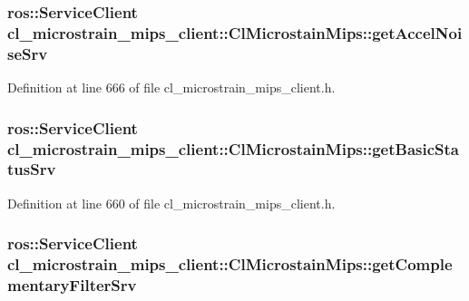 \subsubsection[{\texorpdfstring{get\+Accel\+Noise\+Srv}{getAccelNoiseSrv}}]{\setlength{\rightskip}{0pt plus 5cm}ros\+::\+Service\+Client cl\+\_\+microstrain\+\_\+mips\+\_\+client\+::\+Cl\+Microstain\+Mips\+::get\+Accel\+Noise\+Srv\hspace{0.3cm}{\ttfamily [protected]}}\hypertarget{classcl__microstrain__mips__client_1_1ClMicrostainMips_a0e216421596a37cc683a07c386e16190}{}\label{classcl__microstrain__mips__client_1_1ClMicrostainMips_a0e216421596a37cc683a07c386e16190}


Definition at line 666 of file cl\+\_\+microstrain\+\_\+mips\+\_\+client.\+h.

\subsubsection[{\texorpdfstring{get\+Basic\+Status\+Srv}{getBasicStatusSrv}}]{\setlength{\rightskip}{0pt plus 5cm}ros\+::\+Service\+Client cl\+\_\+microstrain\+\_\+mips\+\_\+client\+::\+Cl\+Microstain\+Mips\+::get\+Basic\+Status\+Srv\hspace{0.3cm}{\ttfamily [protected]}}\hypertarget{classcl__microstrain__mips__client_1_1ClMicrostainMips_ac991f736b5873d50d5b1050ad5ca7ce9}{}\label{classcl__microstrain__mips__client_1_1ClMicrostainMips_ac991f736b5873d50d5b1050ad5ca7ce9}


Definition at line 660 of file cl\+\_\+microstrain\+\_\+mips\+\_\+client.\+h.

\subsubsection[{\texorpdfstring{get\+Complementary\+Filter\+Srv}{getComplementaryFilterSrv}}]{\setlength{\rightskip}{0pt plus 5cm}ros\+::\+Service\+Client cl\+\_\+microstrain\+\_\+mips\+\_\+client\+::\+Cl\+Microstain\+Mips\+::get\+Complementary\+Filter\+Srv\hspace{0.3cm}{\ttfamily [protected]}}\hypertarget{classcl__microstrain__mips__client_1_1ClMicrostainMips_a0dce6daea65bfc730496c95025cbc403}{}\label{classcl__microstrain__mips__client_1_1ClMicrostainMips_a0dce6daea65bfc730496c95025cbc403}



